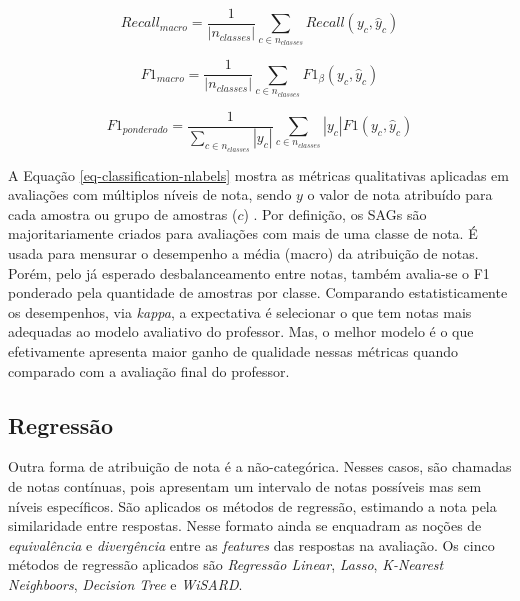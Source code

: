 \begin{equation*}
Recall_{macro} = \frac{1}{\left|n_{classes}\right|} \sum_{c \in n_{classes}} Recall(y_c, \hat{y}_c)
\end{equation*}

\begin{equation*}
F{1}_{macro} = \frac{1}{\left|n_{classes}\right|} \sum_{c \in n_{classes}} F{1}_\beta(y_c, \hat{y}_c)
\end{equation*}

\begin{equation*}
F{1}_{ponderado} = \frac{1}{\sum_{c \in n_{classes}} \left|y_c\right|} \sum_{c \in n_{classes}} \left|y_c\right| F{1}(y_c, \hat{y}_c)
\end{equation*}

A Equação \ref{eq-classification-nlabels} mostra as métricas qualitativas aplicadas em avaliações com múltiplos níveis de nota, sendo $y$ o valor de nota atribuído para cada amostra ou grupo de amostras ($c$) \cite{manning2008}. Por definição, os SAGs são majoritariamente criados para avaliações com mais de uma classe de nota. É usada para mensurar o desempenho a média (macro) da atribuição de notas. Porém, pelo já esperado desbalanceamento entre notas, também avalia-se o F1 ponderado pela quantidade de amostras por classe. Comparando estatisticamente os desempenhos, via \textit{kappa}, a expectativa é selecionar o que tem notas mais adequadas ao modelo avaliativo do professor. Mas, o melhor modelo é o que efetivamente apresenta maior ganho de qualidade nessas métricas quando comparado com a avaliação final do professor.


\subsection{Regressão}
\label{subsec-regressao}

Outra forma de atribuição de nota é a não-categórica. Nesses casos, são chamadas de notas contínuas, pois apresentam um intervalo de notas possíveis mas sem níveis específicos. São aplicados os métodos de regressão, estimando a nota pela similaridade entre respostas. Nesse formato ainda se enquadram as noções de \textit{equivalência} e \textit{divergência} entre as \textit{features} das respostas na avaliação. Os cinco métodos de regressão aplicados são \textit{Regressão Linear}, \textit{Lasso}, \textit{K-Nearest Neighboors}, \textit{Decision Tree} e \textit{WiSARD}.

